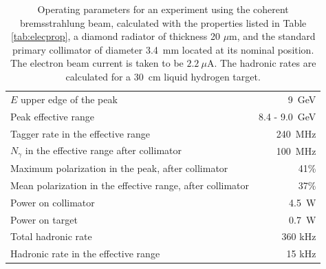 \begin{table}[tbp]
\begin{center}
\caption[Operating parameters for an experiment]{\label{tab:operates}
Operating parameters for an experiment using the coherent bremsstrahlung beam,
calculated with the properties
listed in Table \ref{tab:elecprop}, a diamond radiator of thickness 20 $\mu$m, and the standard
primary collimator of diameter 3.4~mm located at its nominal position.
The electron beam current is taken to 
be $2.2~\mu$A. The hadronic rates are calculated for 
a 30~cm liquid hydrogen target.}

\begin{tabular}{|l|r|}
\hline\hline
$E$ upper edge of the peak & 9~GeV \\
Peak effective range       & 8.4 - 9.0~GeV\\
Tagger rate in the effective range & 240~MHz  \\
$N_{\gamma}$ in the effective range after collimator & 100~MHz  \\
Maximum polarization in the peak, after collimator & 41\% \\
Mean polarization in the effective range, after collimator & 37\% \\
Power on collimator & 4.5~W \\
Power on target & 0.7~W \\
Total hadronic rate & 360 kHz \\
Hadronic rate in the effective range & 15 kHz \\
\hline\hline
\end{tabular}
\end{center}
\end{table}


